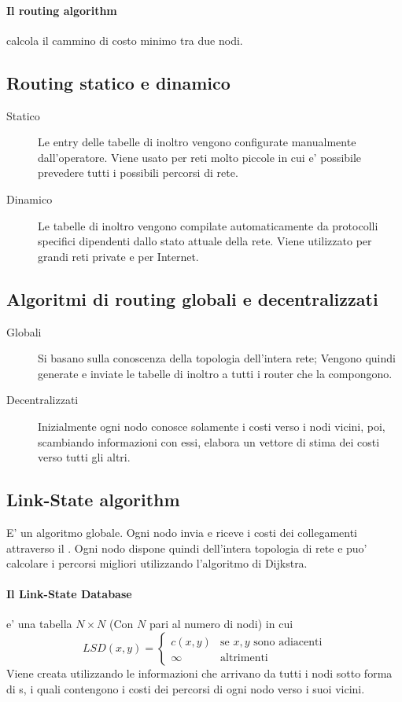 \paragraph{Il routing algorithm} calcola il cammino di costo minimo tra due nodi.

\subsection{Routing statico e dinamico}
\begin{description}
    \item[Statico] Le entry delle tabelle di inoltro vengono configurate manualmente dall'operatore. Viene usato per reti molto piccole in cui e' possibile prevedere tutti i possibili percorsi di rete.
    \item[Dinamico] Le tabelle di inoltro vengono compilate automaticamente da protocolli specifici dipendenti dallo stato attuale della rete. Viene utilizzato per grandi reti private e per Internet.
\end{description}
\subsection{Algoritmi di routing globali e decentralizzati}
\begin{description}
    \item[Globali] Si basano sulla conoscenza della topologia dell'intera rete; Vengono quindi generate e inviate le tabelle di inoltro a tutti i router che la compongono.
    \item[Decentralizzati] Inizialmente ogni nodo conosce solamente i costi verso i nodi vicini, poi, scambiando informazioni con essi, elabora un vettore di stima dei costi verso tutti gli altri.
\end{description}
\subsection{Link-State algorithm}
E' un algoritmo globale. Ogni nodo invia e riceve i costi dei collegamenti attraverso il . Ogni nodo dispone quindi dell'intera topologia di rete e puo' calcolare i percorsi migliori utilizzando l'algoritmo di Dijkstra.
\paragraph{Il Link-State Database} e' una tabella $N\times N$ (Con $N$ pari al numero di nodi) in cui 
\[LSD(x, y) =
\begin{cases}
    c(x, y) & \mbox{se } x, y \mbox{ sono adiacenti}\\
    \infty & \mbox{altrimenti}
\end{cases}\]
Viene creata utilizzando le informazioni che arrivano da tutti i nodi sotto forma di s, i quali contengono i costi dei percorsi di ogni nodo verso i suoi vicini.
